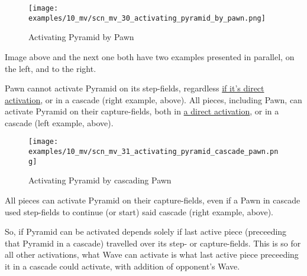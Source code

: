 \vspace*{-1.4\baselineskip}
\noindent
\begin{figure}[!h]
\texttt{[image: examples/10\_mv/scn\_mv\_30\_activating\_pyramid\_by\_pawn.png]}
\vspace*{-1.3\baselineskip}
\caption{Activating Pyramid by Pawn}
\label{fig:scn_mv_30_activating_pyramid_by_pawn}
\end{figure}

\vspace*{-0.3\baselineskip}
Image above and the next one both have two examples presented in parallel, on the left,
and to the right.

Pawn cannot activate Pyramid on its step-fields, regardless
\hyperref[fig:scn_ma_04_pyramid_activation_by_pawn]{if it's direct activation}, or in a cascade
(right example, above). All pieces, including Pawn, can activate Pyramid on their capture-fields,
both in \hyperref[fig:scn_ma_01_pyramid_activation_init]{a direct activation}, or in a cascade
(left example, above).

\clearpage %

\vspace*{-2.1\baselineskip}
\noindent
\begin{figure}[!h]
\texttt{[image: examples/10\_mv/scn\_mv\_31\_activating\_pyramid\_cascade\_pawn.png]}
\vspace*{-1.3\baselineskip}
\caption{Activating Pyramid by cascading Pawn}
\label{fig:scn_mv_31_activating_pyramid_cascade_pawn}
\end{figure}

\vspace*{-0.3\baselineskip}
All pieces can activate Pyramid on their capture-fields, even if a Pawn in cascade used
step-fields to continue (or start) said cascade (right example, above).

So, if Pyramid can be activated depends solely if last active piece (preceeding that Pyramid
in a cascade) travelled over its step- or capture-fields. This is so for all other activations,
what Wave can activate is what last active piece preceeding it in a cascade could activate,
with addition of opponent's Wave.

\clearpage %

